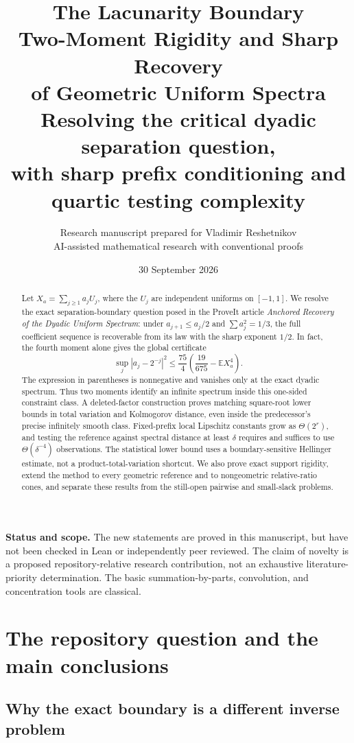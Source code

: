 \documentclass[11pt,a4paper]{article}
\title{\textbf{The Lacunarity Boundary}\\[7pt]
\Large Two-Moment Rigidity and Sharp Recovery\\of Geometric Uniform Spectra\\[9pt]
\large Resolving the critical dyadic separation question,\\with sharp prefix conditioning and quartic testing complexity}
\author{Research manuscript prepared for Vladimir Reshetnikov\\
\small AI-assisted mathematical research with conventional proofs}
\date{30 September 2026}
\numberwithin{equation}{section}
\theoremstyle{definition}
\theoremstyle{remark}
\newcommand{\E}{\mathbb E}
\begin{document}
\maketitle
\begin{abstract}
Let $X_a=\sum_{j\ge1}a_jU_j$, where the $U_j$ are independent uniforms
on $[-1,1]$. We resolve the exact separation-boundary question posed in the
ProveIt article \emph{Anchored Recovery of the Dyadic Uniform Spectrum}:
under $a_{j+1}\le a_j/2$ and $\sum a_j^2=1/3$, the full coefficient
sequence is recoverable from its law with the sharp exponent $1/2$.
In fact, the fourth moment alone gives the global certificate
\[
 \sup_j|a_j-2^{-j}|^2
 \le \frac{75}{4}\left(\frac{19}{675}-\E X_a^4\right).
\]
The expression in parentheses is nonnegative and vanishes only at the exact
dyadic spectrum. Thus two moments identify an infinite spectrum inside this
one-sided constraint class. A deleted-factor construction proves matching
square-root lower bounds in total variation and Kolmogorov distance, even
inside the predecessor's precise infinitely smooth class. Fixed-prefix local
Lipschitz constants grow as $\Theta(2^r)$, and testing the reference against
spectral distance at least $\delta$ requires and suffices to use
$\Theta(\delta^{-4})$ observations. The statistical lower bound uses a
boundary-sensitive Hellinger estimate, not a product-total-variation shortcut.
We also prove exact support rigidity, extend the method to every geometric
reference and to nongeometric relative-ratio cones, and separate these results
from the still-open pairwise and small-slack problems.
\end{abstract}

\noindent\textbf{Status and scope.} The new statements are proved in this
manuscript, but have not been checked in Lean or independently peer reviewed.
The claim of novelty is a proposed repository-relative research contribution,
not an exhaustive literature-priority determination. The basic summation-by-parts,
convolution, and concentration tools are classical.

\clearpage
\begingroup\small\setlength{\parskip}{0pt}\tableofcontents\endgroup
\clearpage

\section{The repository question and the main conclusions}
\label{sec:introduction}

\subsection{Why the exact boundary is a different inverse problem}
\end{document}
